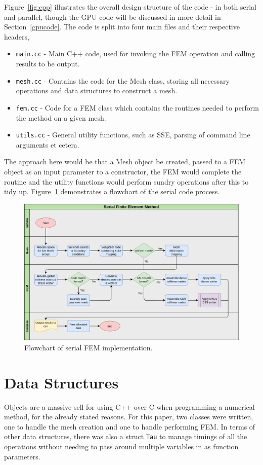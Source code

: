 Figure~\ref{fig:cpp} illustrates the overall design structure of the code - in both serial and parallel, though the GPU code will be discussed in more detail in Section~\ref{gpucode}. The code is split into four main files and their respective headers,
\begin{itemize}
	\item \texttt{main.cc} - Main C++ code, used for invoking the FEM operation and calling results to be output.
	\item \texttt{mesh.cc} - Contains the code for the Mesh class, storing all necessary operations and data structures to construct a mesh.
	\item \texttt{fem.cc} - Code for a FEM class which contains the routines needed to perform the method on a given mesh.
	\item \texttt{utils.cc} - General utility functions, such as SSE, parsing of command line arguments et cetera.
\end{itemize}
The approach here would be that a Mesh object be created, passed to a FEM object as an input parameter to a constructor, the FEM would complete the routine and the utility functions would perform sundry operations after this to tidy up. Figure~\ref{fig:serial_flow} demonstrates a flowchart of the serial code process.
\begin{figure}
	\centering
	\includegraphics[width = 0.9\linewidth]{Figures/serial_flowchart}
	\caption{Flowchart of serial FEM implementation.}
	\label{fig:serial_flow}
\end{figure}

\section{Data Structures}

Objects are a massive sell for using C++ over C when programming a numerical method, for the already stated reasons. For this paper, two classes were written, one to handle the mesh creation and one to handle performing FEM. In terms of other data structures, there was also a struct \texttt{Tau} to manage timings of all the operations without needing to pass around multiple variables in as function parameters.

